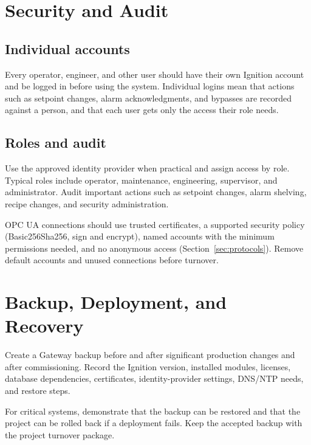 \section{Security and Audit}
\subsection*{Individual accounts}\label{sec:ignition-accounts}
Every operator, engineer, and other user should have their own Ignition account and be logged in before using the system. Individual logins mean that actions such as setpoint changes, alarm acknowledgments, and bypasses are recorded against a person, and that each user gets only the access their role needs.

\subsection*{Roles and audit}
Use the approved identity provider when practical and assign access by role. Typical roles include operator, maintenance, engineering, supervisor, and administrator. Audit important actions such as setpoint changes, alarm shelving, recipe changes, and security administration.

OPC UA connections should use trusted certificates, a supported security policy (Basic256Sha256, sign and encrypt), named accounts with the minimum permissions needed, and no anonymous access (Section~\ref{sec:protocols}). Remove default accounts and unused connections before turnover.

\section{Backup, Deployment, and Recovery}
Create a Gateway backup before and after significant production changes and after commissioning. Record the Ignition version, installed modules, licenses, database dependencies, certificates, identity-provider settings, DNS/NTP needs, and restore steps.

For critical systems, demonstrate that the backup can be restored and that the project can be rolled back if a deployment fails. Keep the accepted backup with the project turnover package.
